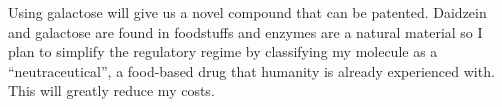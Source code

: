 \documentclass[]{tufte-handout}
\begin{document}
Using galactose will give us a novel compound that can be patented. Daidzein and galactose are found in foodstuffs and enzymes are a natural material so I plan to simplify the regulatory regime by classifying my molecule as a ``neutraceutical'', a food-based drug that humanity is already experienced with. This will greatly reduce my costs.

\nobibliography{}
\end{document}
